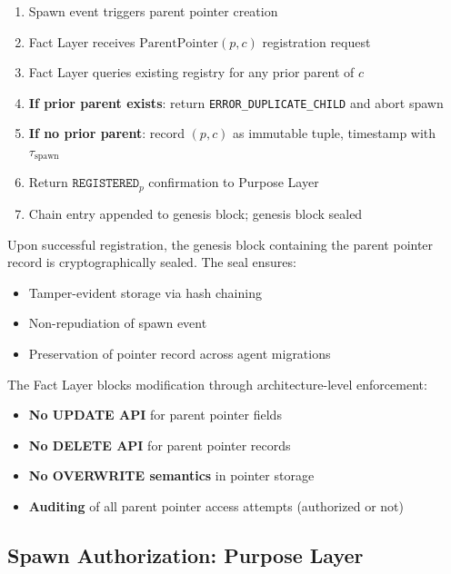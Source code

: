 \begin{algorithm}
\begin{enumerate}
    \item Spawn event triggers parent pointer creation
    \item Fact Layer receives $\text{ParentPointer}(p, c)$ registration request
    \item Fact Layer queries existing registry for any prior parent of $c$
    \item \textbf{If prior parent exists}: return \texttt{ERROR\_DUPLICATE\_CHILD} and abort spawn
    \item \textbf{If no prior parent}: record $(p, c)$ as immutable tuple, timestamp with $\tau_\text{spawn}$
    \item Return $\texttt{REGISTERED}_p$ confirmation to Purpose Layer
    \item Chain entry appended to genesis block; genesis block sealed
\end{enumerate}
\end{algorithm}

\begin{property}
Upon successful registration, the genesis block containing the parent pointer record is cryptographically sealed. The seal ensures:
\begin{itemize}
    \item Tamper-evident storage via hash chaining
    \item Non-repudiation of spawn event
    \item Preservation of pointer record across agent migrations
\end{itemize}
\end{property}

The Fact Layer blocks modification through architecture-level enforcement:

\begin{itemize}
    \item \textbf{No UPDATE API} for parent pointer fields
    \item \textbf{No DELETE API} for parent pointer records
    \item \textbf{No OVERWRITE semantics} in pointer storage
    \item \textbf{Auditing} of all parent pointer access attempts (authorized or not)
\end{itemize}

\subsection{Spawn Authorization: Purpose Layer}

